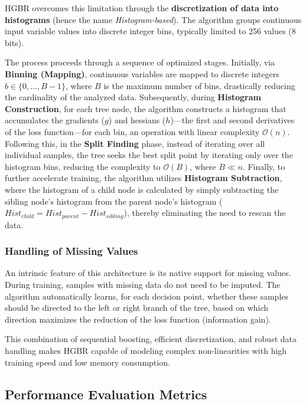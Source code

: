 HGBR overcomes this limitation through the \textbf{discretization of data into histograms} (hence the name \textit{Histogram-based}). The algorithm groups continuous input variable values into discrete integer bins, typically limited to 256 values (8 bits). 

The process proceeds through a sequence of optimized stages. Initially, via \textbf{Binning (Mapping)}, continuous variables are mapped to discrete integers $b \in \{0, \dots, B-1\}$, where $B$ is the maximum number of bins, drastically reducing the cardinality of the analyzed data. Subsequently, during \textbf{Histogram Construction}, for each tree node, the algorithm constructs a histogram that accumulates the gradients ($g$) and hessians ($h$)—the first and second derivatives of the loss function—for each bin, an operation with linear complexity $\mathcal{O}(n)$. Following this, in the \textbf{Split Finding} phase, instead of iterating over all individual samples, the tree seeks the best split point by iterating only over the histogram bins, reducing the complexity to $\mathcal{O}(B)$, where $B \ll n$. Finally, to further accelerate training, the algorithm utilizes \textbf{Histogram Subtraction}, where the histogram of a child node is calculated by simply subtracting the sibling node's histogram from the parent node's histogram ($Hist_{child} = Hist_{parent} - Hist_{sibling}$), thereby eliminating the need to rescan the data.

\subsubsection{Handling of Missing Values}

An intrinsic feature of this architecture is its native support for missing values. During training, samples with missing data do not need to be imputed. The algorithm automatically learns, for each decision point, whether these samples should be directed to the left or right branch of the tree, based on which direction maximizes the reduction of the loss function (information gain).

This combination of sequential boosting, efficient discretization, and robust data handling makes HGBR capable of modeling complex non-linearities with high training speed and low memory consumption.

\subsection{Performance Evaluation Metrics}


